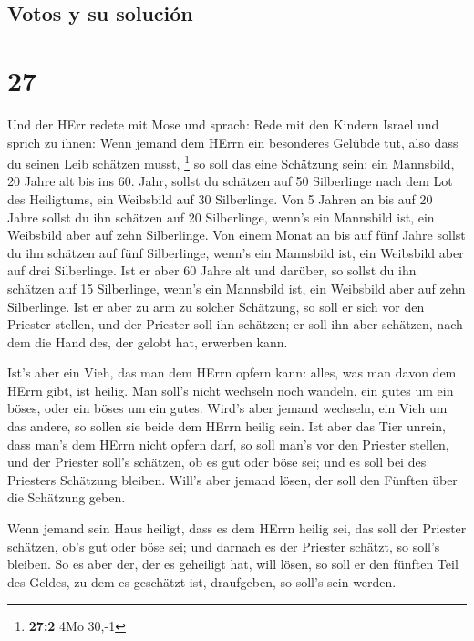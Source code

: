 \hypertarget{votos-y-su-soluciuxf3n}{%
\subsection{Votos y su solución}\label{votos-y-su-soluciuxf3n}}

\hypertarget{section-26}{%
\section{27}\label{section-26}}

 Und der HErr redete mit Mose und sprach: 
Rede mit den Kindern Israel und sprich zu ihnen: Wenn jemand dem HErrn
ein besonderes Gelübde tut, also dass du seinen Leib schätzen musst,
\footnote{\textbf{27:2} 4Mo 30,-1}  so soll das eine
Schätzung sein: ein Mannsbild, 20 Jahre alt bis ins 60. Jahr, sollst du
schätzen auf 50 Silberlinge nach dem Lot des Heiligtums, 
ein Weibsbild auf 30 Silberlinge.  Von 5 Jahren an bis auf
20 Jahre sollst du ihn schätzen auf 20 Silberlinge, wenn's ein Mannsbild
ist, ein Weibsbild aber auf zehn Silberlinge.  Von einem
Monat an bis auf fünf Jahre sollst du ihn schätzen auf fünf Silberlinge,
wenn's ein Mannsbild ist, ein Weibsbild aber auf drei Silberlinge.
 Ist er aber 60 Jahre alt und darüber, so sollst du ihn
schätzen auf 15 Silberlinge, wenn's ein Mannsbild ist, ein Weibsbild
aber auf zehn Silberlinge.  Ist er aber zu arm zu solcher
Schätzung, so soll er sich vor den Priester stellen, und der Priester
soll ihn schätzen; er soll ihn aber schätzen, nach dem die Hand des, der
gelobt hat, erwerben kann.

 Ist's aber ein Vieh, das man dem HErrn opfern kann:
alles, was man davon dem HErrn gibt, ist heilig.  Man
soll's nicht wechseln noch wandeln, ein gutes um ein böses, oder ein
böses um ein gutes. Wird's aber jemand wechseln, ein Vieh um das andere,
so sollen sie beide dem HErrn heilig sein.  Ist aber das
Tier unrein, dass man's dem HErrn nicht opfern darf, so soll man's vor
den Priester stellen,  und der Priester soll's schätzen,
ob es gut oder böse sei; und es soll bei des Priesters Schätzung
bleiben.  Will's aber jemand lösen, der soll den Fünften
über die Schätzung geben.

 Wenn jemand sein Haus heiligt, dass es dem HErrn heilig
sei, das soll der Priester schätzen, ob's gut oder böse sei; und darnach
es der Priester schätzt, so soll's bleiben.  So es aber
der, der es geheiligt hat, will lösen, so soll er den fünften Teil des
Geldes, zu dem es geschätzt ist, draufgeben, so soll's sein werden.

